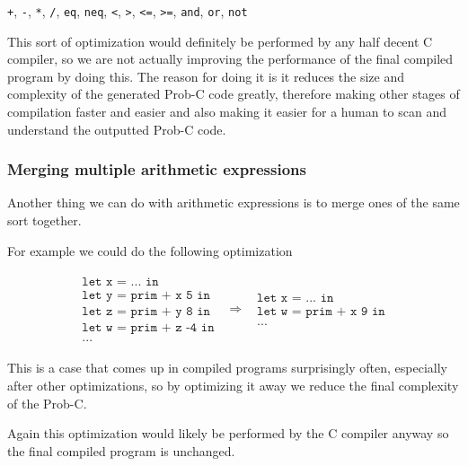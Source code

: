 \documentclass[a4paper]{article}
\newcommand{\optimization}[2]{
	\[
		\begin{array}{rcl}
			#1 & \Rightarrow & #2
		\end{array}
	\]
}
\begin{document}
\begin{center}
	\texttt{+}, \texttt{-}, \texttt{*}, \texttt{/}, \texttt{eq}, \texttt{neq}, \texttt{<}, \texttt{>}, \texttt{<=}, \texttt{>=}, \texttt{and}, \texttt{or}, \texttt{not}
\end{center}
This sort of optimization would definitely be performed by any half decent C compiler, so we are not actually improving the performance of the final compiled program by doing this. The reason for doing it is it reduces the size and complexity of the generated Prob-C code greatly, therefore making other stages of compilation faster and easier and also making it easier for a human to scan and understand the outputted Prob-C code.




\subsubsection{Merging multiple arithmetic expressions}

Another thing we can do with arithmetic expressions is to merge ones of the same sort together.

For example we could do the following optimization

\optimization{
	\begin{array}{l}
		\texttt{let x = ... in} \\
		\texttt{let y = prim + x 5 in} \\
		\texttt{let z = prim + y 8 in} \\
		\texttt{let w = prim + z -4 in} \\
		\texttt{...}
	\end{array}
}{
	\begin{array}{l}
		\texttt{let x = ... in} \\
		\texttt{let w = prim + x 9 in} \\
		\texttt{...}
	\end{array}
}
This is a case that comes up in compiled programs surprisingly often, especially after other optimizations, so by optimizing it away we reduce the final complexity of the Prob-C.

Again this optimization would likely be performed by the C compiler anyway so the final compiled program is unchanged.
\end{document}
